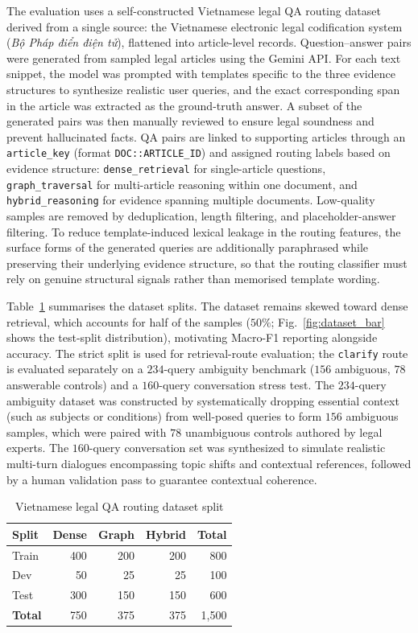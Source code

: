 The evaluation uses a self-constructed Vietnamese legal QA routing dataset
derived from a single source: the Vietnamese electronic legal codification
system (\textit{Bộ Pháp điển điện tử}), flattened into article-level records.
Question--answer pairs were generated from sampled legal articles using the
Gemini API. For each text snippet, the model was prompted with templates
specific to the three evidence structures to synthesize realistic user
queries, and the exact corresponding span in the article was extracted as the
ground-truth answer. A subset of the generated pairs was then manually
reviewed to ensure legal soundness and prevent hallucinated facts.
QA pairs are linked to supporting articles through an \texttt{article\_key}
(format \texttt{DOC::ARTICLE\_ID}) and assigned routing labels based on
evidence structure: \texttt{dense\_retrieval} for single-article questions,
\texttt{graph\_traversal} for multi-article reasoning within one document,
and \texttt{hybrid\_reasoning} for evidence spanning multiple documents.
Low-quality samples are removed by deduplication, length filtering, and
placeholder-answer filtering. To reduce template-induced lexical leakage in
the routing features, the surface forms of the generated queries are
additionally paraphrased while preserving their underlying evidence
structure, so that the routing classifier must rely on genuine structural
signals rather than memorised template wording.

Table~\ref{tab:dataset} summarises the dataset splits. The dataset remains
skewed toward dense retrieval, which accounts for half of the samples
($50\%$; Fig.~\ref{fig:dataset_bar} shows the test-split distribution),
motivating Macro-F1 reporting alongside accuracy. The strict split
is used for retrieval-route evaluation; the \texttt{clarify} route is
evaluated separately on a $234$-query ambiguity benchmark ($156$ ambiguous,
$78$ answerable controls) and a $160$-query conversation stress test.
The $234$-query ambiguity dataset was constructed by systematically dropping
essential context (such as subjects or conditions) from well-posed queries to
form $156$ ambiguous samples, which were paired with $78$ unambiguous
controls authored by legal experts. The $160$-query conversation set was
synthesized to simulate realistic multi-turn dialogues encompassing topic
shifts and contextual references, followed by a human validation pass to
guarantee contextual coherence.

\begin{table}[!htbp]
\centering
\caption{Vietnamese legal QA routing dataset split}\label{tab:dataset}
\begin{tabular}{lrrrr}
\toprule
\textbf{Split} & \textbf{Dense} & \textbf{Graph} & \textbf{Hybrid} & \textbf{Total} \\
\midrule
Train & 400 & 200 & 200 & 800 \\
Dev   & 50  & 25  & 25  & 100 \\
Test  & 300 & 150 & 150 & 600 \\
\midrule
\textbf{Total} & 750 & 375 & 375 & 1{,}500 \\
\bottomrule
\end{tabular}
\end{table}

